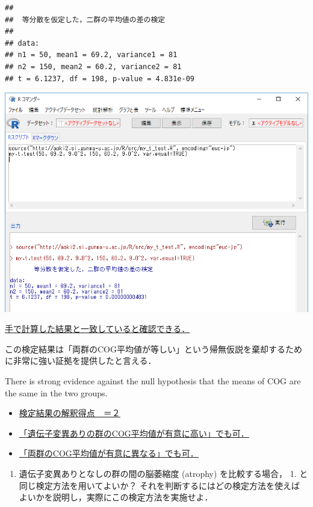 \documentclass[]{problemset}
\providecommand{\tightlist}{%
  \setlength{\itemsep}{0pt}\setlength{\parskip}{0pt}}
\begin{document}
\begin{verbatim}
## 
##  等分散を仮定した，二群の平均値の差の検定
## 
## data:  
## n1 = 50, mean1 = 69.2, variance1 = 81
## n2 = 150, mean2 = 60.2, variance2 = 81
## t = 6.1237, df = 198, p-value = 4.831e-09
\end{verbatim}

\begin{center}\includegraphics[width=0.9\linewidth]{pic/myttest01} \end{center}
\bigskip

\underline{手で計算した結果と一致していると確認できる．}

この検定結果は「両群のCOG平均値が等しい」という帰無仮説を棄却するために非常に強い証拠を提供したと言える．

There is strong evidence against the null hypothesis that the means of
COG are the same in the two groups.

\begin{itemize}
\item
  \underline{検定結果の解釈得点　＝２}
\item
  \underline{「遺伝子変異ありの群のCOG平均値が有意に高い」でも可．}
\item
  \underline{「両群のCOG平均値が有意に異なる」でも可．}
\end{itemize}

\begin{enumerate}
\def\labelenumi{\arabic{enumi}.}
\setcounter{enumi}{1}
\tightlist
\item
  遺伝子変異ありとなしの群の間の脳萎縮度 (atrophy) を比較する場合， 1.
  と同じ検定方法を用いてよいか？
  それを判断するにはどの検定方法を使えばよいかを説明し，実際にこの検定方法を実施せよ．
\end{enumerate}
\end{document}
